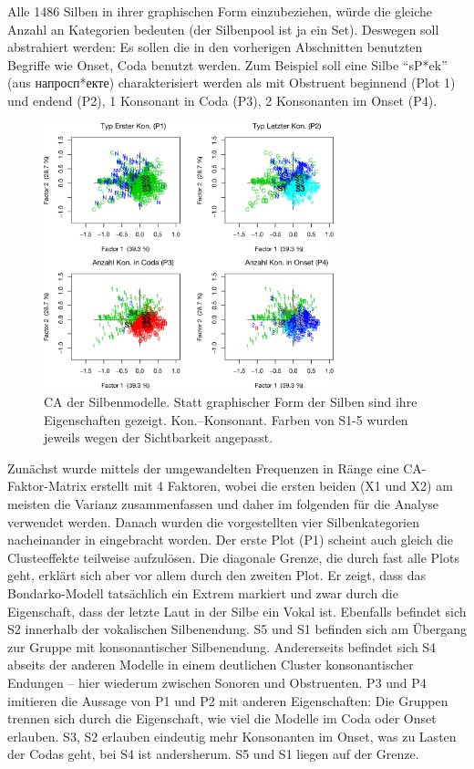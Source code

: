 \documentclass[12pt,headsepline,a4paper]{scrartcl}
\newcommand\textcyr[1]{{\fontencoding{OT2}\fontfamily{wncyr}\selectfont #1}}
\begin{document}
Alle 1486 Silben in ihrer graphischen Form einzubeziehen, würde die gleiche Anzahl an Kategorien bedeuten (der Silbenpool ist ja ein Set).
Deswegen soll abstrahiert werden: 
Es sollen die in den vorherigen  Abschnitten benutzten Begriffe wie Onset, Coda benutzt werden. Zum Beispiel soll eine Silbe "`sP*ek"' (aus \textcyr{напросп*екте}) charakterisiert werden als mit Obstruent beginnend (Plot 1) und endend (P2), 1 Konsonant in Coda (P3), 2 Konsonanten im Onset (P4). 
 
\begin{figure}[htbp]
\centering
\includegraphics[width=0.75\textwidth]{figures/ca_syls.png}
\caption{CA der Silbenmodelle. Statt graphischer Form der Silben sind ihre Eigenschaften gezeigt. Kon.--Konsonant. Farben von S1-5 wurden jeweils wegen der Sichtbarkeit angepasst.}
\label{fig: ca_syls}
\end{figure} 

Zunächst wurde mittels der umgewandelten Frequenzen in Ränge eine CA-Faktor-Matrix erstellt mit 4 Faktoren, wobei die ersten beiden (X1 und X2) am meisten die Varianz zusammenfassen und daher im folgenden für die Analyse verwendet werden.
Danach wurden die vorgestellten vier Silbenkategorien nacheinander in  eingebracht worden. Der erste Plot (P1) scheint auch gleich die Clusteeffekte teilweise aufzulösen. Die diagonale Grenze, die durch fast alle Plots geht, erklärt sich aber vor allem durch den zweiten Plot. Er zeigt, dass das Bondarko-Modell tatsächlich ein Extrem markiert und zwar durch die Eigenschaft, dass der letzte Laut in der Silbe ein Vokal ist. Ebenfalls befindet sich S2 innerhalb der vokalischen Silbenendung. S5 und S1 befinden sich am Übergang zur Gruppe mit konsonantischer Silbenendung. Andererseits befindet sich S4 abseits der anderen Modelle in einem deutlichen Cluster konsonantischer Endungen -- hier wiederum zwischen Sonoren und Obstruenten. P3 und P4 imitieren die Aussage von P1 und P2 mit anderen Eigenschaften: Die Gruppen trennen sich durch die Eigenschaft, wie viel die Modelle im Coda oder Onset erlauben. S3, S2 erlauben eindeutig mehr Konsonanten im Onset, was zu Lasten der Codas geht, bei S4 ist andersherum. S5 und S1 liegen auf der Grenze. 
\end{document}
